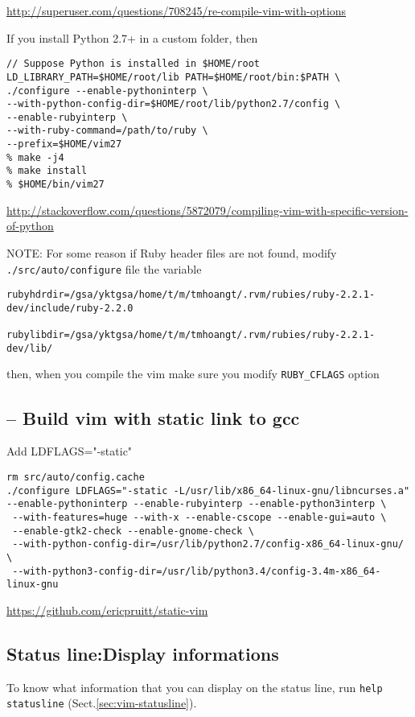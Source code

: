 \url{http://superuser.com/questions/708245/re-compile-vim-with-options}

If you install Python 2.7+ in a custom folder, then
\begin{verbatim}
// Suppose Python is installed in $HOME/root
LD_LIBRARY_PATH=$HOME/root/lib PATH=$HOME/root/bin:$PATH \
./configure --enable-pythoninterp \ 
--with-python-config-dir=$HOME/root/lib/python2.7/config \
--enable-rubyinterp \
--with-ruby-command=/path/to/ruby \
--prefix=$HOME/vim27 
% make -j4
% make install
% $HOME/bin/vim27
\end{verbatim}
\url{http://stackoverflow.com/questions/5872079/compiling-vim-with-specific-version-of-python}

NOTE: For some reason if Ruby header files are not found, modify 
\verb!./src/auto/configure! file the variable
\begin{verbatim}
rubyhdrdir=/gsa/yktgsa/home/t/m/tmhoangt/.rvm/rubies/ruby-2.2.1-dev/include/ruby-2.2.0

rubylibdir=/gsa/yktgsa/home/t/m/tmhoangt/.rvm/rubies/ruby-2.2.1-dev/lib/
\end{verbatim}
then, when you compile the vim make sure you modify \verb!RUBY_CFLAGS! option

\subsection{-- Build vim with static link to gcc}

Add LDFLAGS="-static" 

\begin{verbatim}
rm src/auto/config.cache
./configure LDFLAGS="-static -L/usr/lib/x86_64-linux-gnu/libncurses.a"
--enable-pythoninterp --enable-rubyinterp --enable-python3interp \ 
 --with-features=huge --with-x --enable-cscope --enable-gui=auto \
 --enable-gtk2-check --enable-gnome-check \
 --with-python-config-dir=/usr/lib/python2.7/config-x86_64-linux-gnu/ \
 --with-python3-config-dir=/usr/lib/python3.4/config-3.4m-x86_64-linux-gnu 

\end{verbatim}
\url{https://github.com/ericpruitt/static-vim}


\subsection{Status line:Display informations}

To know what information that you can display on the status line, run
\verb!help statusline! (Sect.\ref{sec:vim-statusline}).  

